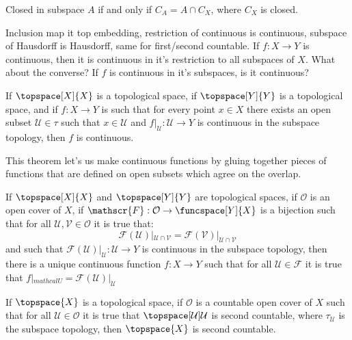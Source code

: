     \begin{theorem}
        Closed in subspace $A$ if and only if $C_{A}=A\cap{C}_{X}$, where
        $C_{X}$ is closed.
    \end{theorem}
    Inclusion map it top embedding, restriction of continuous is continuous,
    subspace of Hausdorff is Hausdorff, same for first/second countable.
    If $f:X\rightarrow{Y}$ is continuous, then it is continuous in it's
    restriction to all subspaces of $X$. What about the converse? If
    $f$ is continuous in it's subspaces, is it continuous?
    \begin{theorem}
        If $\topspace[X]{X}$ is a topological space, if $\topspace[Y]{Y}$ is
        a topological space, and if $f:X\rightarrow{Y}$ is such that for
        every point $x\in{X}$ there exists an open subset
        $\mathcal{U}\in\tau$ such that $x\in\mathcal{U}$ and
        $f|_{\mathcal{U}}:\mathcal{U}\rightarrow{Y}$ is continuous in the
        subspace topology, then $f$ is continuous.
    \end{theorem}
    This theorem let's us make continuous functions by gluing together
    pieces of functions that are defined on open subsets which agree on the
    overlap.
    \begin{theorem}
        If $\topspace[X]{X}$ and $\topspace[Y]{Y}$ are topological spaces,
        if $\mathcal{O}$ is an open cover of $X$, if
        $\mathscr{F}:\mathcal{O}\rightarrow\funcspace[Y]{X}$ is a bijection
        such that for all $\mathcal{U},\mathcal{V}\in\mathcal{O}$ it is true
        that:
        \begin{equation}
            \mathscr{F}(\mathcal{U})|_{\mathcal{U}\cap\mathcal{V}}=
            \mathscr{F}(\mathcal{V})|_{\mathcal{U}\cap\mathcal{V}}
        \end{equation}
        and such that
        $\mathscr{F}(\mathcal{U})|_{\mathcal{U}}:\mathcal{U}\rightarrow{Y}$
        is continuous in the subspace topology, then there is a unique
        continuous function $f:X\rightarrow{Y}$ such that for all
        $\mathcal{U}\in\mathscr{F}$ it is true that
        $f|_{mathcal{U}}=\mathscr{F}(\mathcal{U})|_{\mathcal{U}}$
    \end{theorem}
    \begin{theorem}
        If $\topspace{X}$ is a topological space, if
        $\mathcal{O}$ is a countable open cover of $X$ such that for all
        $\mathcal{U}\in\mathcal{O}$ it is true that
        $\topspace[\mathcal{U}]{\mathcal{U}}$ is second countable, where
        $\tau_{\mathcal{U}}$ is the subspace topology, then $\topspace{X}$
        is second countable.
    \end{theorem}
